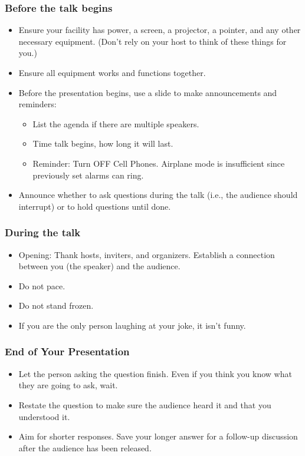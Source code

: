 \subsubsection*{Before the talk begins}
\begin{itemize}
    \item Ensure your facility has power, a screen, a projector, a pointer, and any other necessary equipment. (Don't rely on your host to think of these things for you.)
    \item Ensure all equipment works and functions together.
    \item Before the presentation begins, use a slide to make announcements and reminders:
\begin{itemize}
    \item List the agenda if there are multiple speakers.
    \item Time talk begins, how long it will last.
    \item Reminder: Turn OFF Cell Phones. Airplane mode is insufficient since previously set alarms can ring.
\end{itemize}
    \item Announce whether to ask questions during the talk (i.e., the audience should interrupt) or to hold questions until done.
\end{itemize}

\subsubsection*{During the talk}
\begin{itemize}
    \item Opening: Thank hosts, inviters, and organizers. Establish a connection between you (the speaker) and the audience.
    \item Do not pace.
    \item Do not stand frozen.
    \item If you are the only person laughing at your joke, it isn't funny.
\end{itemize}

 \subsubsection*{End of Your Presentation}

\begin{itemize}
    \item Let the person asking the question finish. Even if you think you know what they are going to ask, wait.
    \item Restate the question to make sure the audience heard it and that you understood it.
    \item Aim for shorter responses. Save your longer answer for a follow-up discussion after the audience has been released.
\end{itemize}


